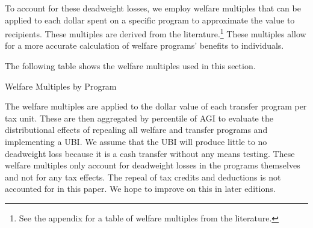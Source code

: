 \documentclass{article}
\begin{document}
To account for these deadweight losses, we employ welfare multiples that can be applied to each dollar spent on a specific program to approximate the value to recipients. These multiples are derived from the literature.\footnote{See the appendix for a table of welfare multiples from the literature.} These multiples allow for a more accurate calculation of welfare programs' benefits to individuals.

The following table shows the welfare multiples used in this section.


\begin{table}[H]
\caption{Welfare Multiples by Program}
\begin{center}
\begin{adjustbox}{max width=\textwidth}

\end{adjustbox}
\end{center}
\end{table}

The welfare multiples are applied to the dollar value of each transfer program per tax unit. These are then aggregated by percentile of AGI to evaluate the distributional effects of repealing all welfare and transfer programs and implementing a UBI. We assume that the UBI will produce little to no deadweight loss because it is a cash transfer without any means testing. These welfare multiples only account for deadweight losses in the programs themselves and not for any tax effects. The repeal of tax credits and deductions is not accounted for in this paper. We hope to improve on this in later editions.
\end{document}
